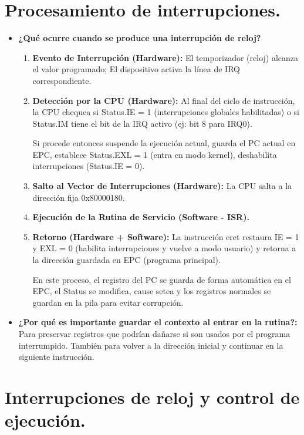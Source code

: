 \documentclass{article}
\begin{document}
\section*{Procesamiento de interrupciones.}

\begin{itemize}
    \item \textbf{¿Qué ocurre cuando se produce una interrupción de reloj?}
    \begin{enumerate}
        \item \textbf{Evento de Interrupción (Hardware): }El temporizador (reloj) alcanza el valor programado; El dispositivo activa la línea de IRQ correspondiente.
        \item \textbf{Detección por la CPU (Hardware): }Al final del ciclo de instrucción, la CPU chequea si Status.IE = 1 (interrupciones globales habilitadas) o si Status.IM tiene el bit de la IRQ activo (ej: bit 8 para IRQ0).

        Si procede entonces suspende la ejecución actual, guarda el PC actual en EPC, establece Status.EXL = 1 (entra en modo kernel), deshabilita interrupciones (Status.IE = 0).
        \item \textbf{Salto al Vector de Interrupciones (Hardware): }La CPU salta a la dirección fija 0x80000180.
        \item \textbf{Ejecución de la Rutina de Servicio (Software - ISR).}
        \item \textbf{Retorno (Hardware + Software): }La instrucción eret restaura IE = 1 y EXL = 0 (habilita interrupciones y vuelve a modo usuario) y retorna a la dirección guardada en EPC (programa principal).

        En este proceso, el registro del PC se guarda de forma automática en el EPC, el Status se modifica, cause setea y los registros normales se guardan en la pila para evitar corrupción.
    \end{enumerate}

    \item \textbf{¿Por qué es importante guardar el contexto al entrar en la rutina?: }Para preservar registros que podrían dañarse si son usados por el programa interrumpido. También para volver a la dirección inicial y continuar en la siguiente instrucción.
\end{itemize}

\section*{Interrupciones de reloj y control de ejecución.}
\end{document}
